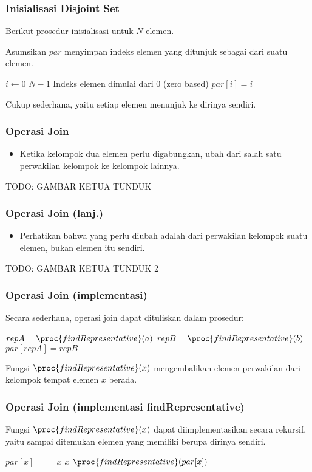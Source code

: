 \begin{frame}
\frametitle{Inisialisasi Disjoint Set}
Berikut prosedur inisialisasi \pdjs untuk $N$ elemen. \newline

Asumsikan \farray $par$ menyimpan indeks elemen yang ditunjuk sebagai  dari suatu elemen.
\begin{codebox}
\li \For $i \gets 0$ \To $N-1$ \Comment Indeks elemen dimulai dari 0 (zero based)
\li \Do   $par[i] = i$ 
    \End
\end{codebox}

Cukup sederhana, yaitu setiap elemen menunjuk ke dirinya sendiri.
\end{frame}

\begin{frame}
\frametitle{Operasi Join}
\begin{itemize}
  \item Ketika kelompok dua elemen perlu digabungkan, ubah  dari salah satu perwakilan kelompok ke kelompok lainnya.
\end{itemize}
TODO: GAMBAR KETUA TUNDUK
\end{frame}

\begin{frame}
\frametitle{Operasi Join (lanj.)}
\begin{itemize}
  \item Perhatikan bahwa yang perlu diubah adalah  dari perwakilan kelompok suatu elemen, bukan elemen itu sendiri.
\end{itemize}
TODO: GAMBAR KETUA TUNDUK 2
\end{frame}

\begin{frame}
\frametitle{Operasi Join (implementasi)}
Secara sederhana, operasi join dapat dituliskan dalam prosedur:

\begin{codebox}
\li $repA = \proc{findRepresentative}(a)$
\li $repB = \proc{findRepresentative}(b)$
\li $par[repA] = repB$
\end{codebox}

Fungsi $\proc{findRepresentative}(x)$ mengembalikan elemen perwakilan dari kelompok tempat elemen $x$ berada.
\end{frame}

\begin{frame}
\frametitle{Operasi Join (implementasi findRepresentative)}
Fungsi $\proc{findRepresentative}(x)$ dapat diimplementasikan secara rekursif, yaitu sampai ditemukan elemen yang memiliki  berupa dirinya sendiri.

\begin{codebox}
\li \If $par[x] == x$ \Then
\li   \Return $x$
\li \Else
\li   \Return $\proc{findRepresentative}(par[x])$
    \End
\end{codebox}
\end{frame}

